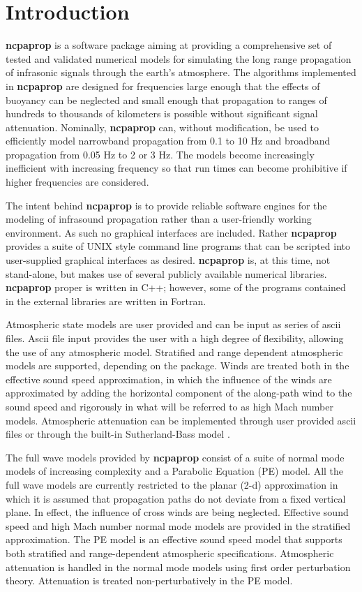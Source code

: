 \section{Introduction}
\label{sec: intro}

\textbf{ncpaprop} is a software package aiming at providing a comprehensive set of tested and validated numerical models for  simulating the long range propagation of infrasonic signals through the earth's atmosphere. The algorithms implemented in \textbf{ncpaprop} are designed for frequencies large enough that the effects of buoyancy can be neglected and small enough that propagation to ranges of hundreds to thousands of kilometers is possible without significant signal attenuation. Nominally,  \textbf{ncpaprop} can, without modification, be used to efficiently model narrowband propagation from 0.1 to 10 Hz and broadband propagation from 0.05 Hz to 2 or 3 Hz. The models become increasingly inefficient with increasing frequency so that run times can become prohibitive if higher frequencies are considered. 

The intent behind \textbf{ncpaprop} is to provide reliable software engines for the modeling of infrasound propagation rather than a user-friendly working environment. As such no graphical interfaces are included. Rather \textbf{ncpaprop} provides a suite of UNIX style command line programs that can be scripted into user-supplied graphical interfaces as desired. \textbf{ncpaprop} is, at this time, not stand-alone, but makes use of several publicly available numerical libraries. \textbf{ncpaprop} proper is written in C++; however, some of the programs contained in the external libraries are written in Fortran. 

Atmospheric state models are user provided and can be input as series of ascii files. Ascii file input provides the user with a high degree of flexibility, allowing the use of any atmospheric model. Stratified and range dependent atmospheric models are supported, depending on the package. Winds are treated both in the effective sound speed approximation, in which the influence of the winds are approximated by adding the horizontal component of the along-path wind to the sound speed \cite{Pierce,Godin_eff_fluid} and rigorously in what will be referred to as high Mach number models. Atmospheric attenuation can be implemented through user provided ascii files or through the built-in Sutherland-Bass model \cite{bass_suth}.

The full wave models provided by \textbf{ncpaprop} consist of a suite of normal mode models of increasing complexity and a Parabolic Equation (PE) model. All the full wave models are currently restricted to the planar (2-d) approximation in which it is assumed that propagation paths do not deviate from a fixed vertical plane. In effect, the influence of cross winds are being neglected. Effective sound speed and high Mach number normal mode models are provided in the stratified approximation. The PE model is an effective sound speed model that supports both stratified and range-dependent atmospheric specifications. Atmospheric attenuation is handled in the normal mode models using first order perturbation theory. Attenuation is treated non-perturbatively in the PE model. 

